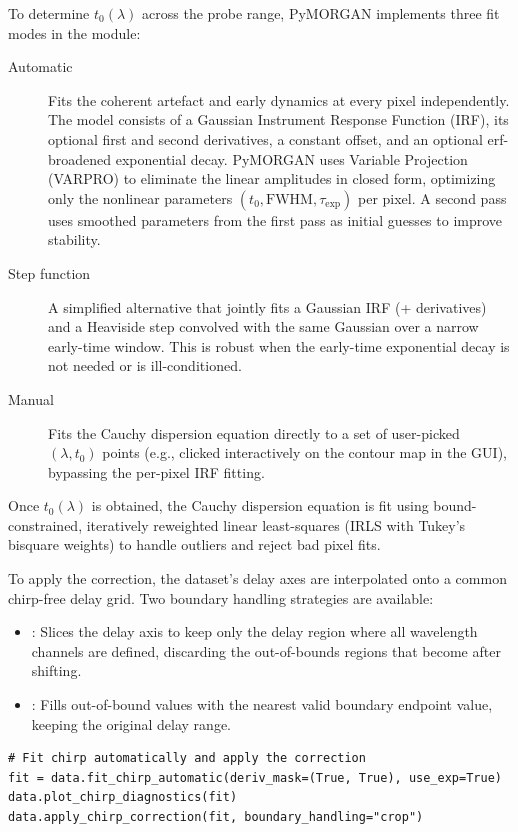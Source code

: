 To determine $t_0(\lambda)$ across the probe range, PyMORGAN implements three fit modes in the  module:
\begin{description}
  \item[Automatic] Fits the coherent artefact and early dynamics at every pixel independently. The model consists of a Gaussian Instrument Response Function (IRF), its optional first and second derivatives, a constant offset, and an optional erf-broadened exponential decay. PyMORGAN uses Variable Projection (VARPRO) to eliminate the linear amplitudes in closed form, optimizing only the nonlinear parameters $(t_0, \mathrm{FWHM}, \tau_{\mathrm{exp}})$ per pixel. A second pass uses smoothed parameters from the first pass as initial guesses to improve stability.
  \item[Step function] A simplified alternative that jointly fits a Gaussian IRF (+ derivatives) and a Heaviside step convolved with the same Gaussian over a narrow early-time window. This is robust when the early-time exponential decay is not needed or is ill-conditioned.
  \item[Manual] Fits the Cauchy dispersion equation directly to a set of user-picked $(\lambda, t_0)$ points (e.g., clicked interactively on the contour map in the GUI), bypassing the per-pixel IRF fitting.
\end{description}

Once $t_0(\lambda)$ is obtained, the Cauchy dispersion equation is fit using bound-constrained, iteratively reweighted linear least-squares (IRLS with Tukey's bisquare weights) to handle outliers and reject bad pixel fits.

To apply the correction, the dataset's delay axes are interpolated onto a common chirp-free delay grid. Two boundary handling strategies are available:
\begin{itemize}
  \item {}: Slices the delay axis to keep only the delay region where all wavelength channels are defined, discarding the out-of-bounds regions that become  after shifting.
  \item {}: Fills out-of-bound values with the nearest valid boundary endpoint value, keeping the original delay range.
\end{itemize}

\begin{lstlisting}
# Fit chirp automatically and apply the correction
fit = data.fit_chirp_automatic(deriv_mask=(True, True), use_exp=True)
data.plot_chirp_diagnostics(fit)
data.apply_chirp_correction(fit, boundary_handling="crop")
\end{lstlisting}

